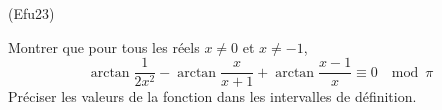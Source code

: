 \begin{tiny}(Efu23)\end{tiny} Montrer que pour tous les réels $x \neq 0$ et $x\neq -1$,
\begin{displaymath}
  \arctan \frac{1}{2x^2} - \arctan \frac{x}{x+1} + \arctan \frac{x-1}{x} \equiv 0 \;\mod \pi
\end{displaymath}
Préciser les valeurs de la fonction dans les intervalles de définition.